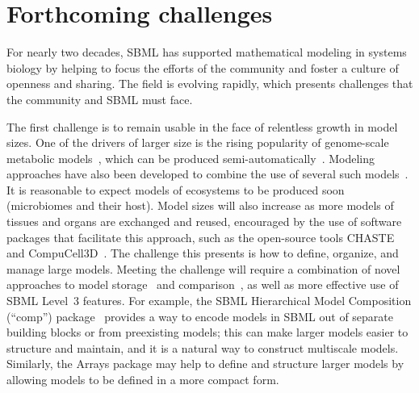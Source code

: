 \documentclass{sbml-paper}
\begin{document}
\section*{Forthcoming challenges}

For nearly two decades, SBML has supported mathematical modeling in systems biology by helping to focus the efforts of the community and foster a culture of openness and sharing.  The field is evolving rapidly, which presents challenges that the community and SBML must face.

The first challenge is to remain usable in the face of relentless growth in model sizes.  One of the drivers of larger size is the rising popularity of genome-scale metabolic models~\citep{Bordbar2014a}, which can be produced semi-automatically~\citep{henry2010high}.  Modeling approaches have also been developed to combine the use of several such models~\citep[e.g.,][]{bordbar2011multi}.  It is reasonable to expect models of ecosystems to be produced soon (\eg microbiomes and their host).  Model sizes will also increase as more models of tissues and organs are exchanged and reused, encouraged by the use of software packages that facilitate this approach, such as the open-source tools CHASTE~\citep{mirams2013chaste} and CompuCell3D~\citep{swat2012multi}.  The challenge this presents is how to define, organize, and manage large models.  Meeting the challenge will require a combination of novel approaches to model storage~\citep[e.g.,][]{Henkel2015combininga} and comparison~\citep[e.g.,][]{Scharm2016algorithm, Scharm2016comodi}, as well as more effective use of SBML Level~3 features.  For example, the SBML Hierarchical Model Composition (``comp'') package~\citep{Smith2015} provides a way to encode models in SBML out of separate building blocks or from preexisting models; this can make larger models easier to structure and maintain, and it is a natural way to construct multiscale models.  Similarly, the Arrays package may help to define and structure larger models by allowing models to be defined in a more compact form. %
\end{document}
